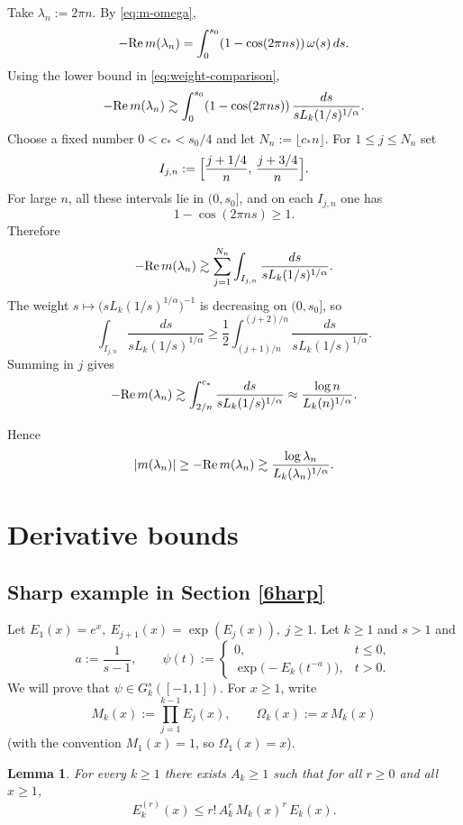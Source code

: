 \documentclass[11pt]{amsart}
\newtheorem{lemma}[theorem]{Lemma}
\renewcommand{\Re}{ {\rm Re}\,}
\newcommand{\1}{{\rm 1\hspace*{-0.4ex}%
			\rule{0.1ex}{1.52ex}\hspace*{0.2ex}}}
\numberwithin{equation}{section}
\begin{document}
Take $\lambda_n:=2\pi n.$
By \eqref{eq:m-omega},
\[
-\Re m(\lambda_n)=\int_0^{s_0}(1-\cos(2\pi ns))\,\omega(s)\,ds.
\]
Using the lower bound in \eqref{eq:weight-comparison},
\[
-\Re m(\lambda_n)
\gtrsim
\int_0^{s_0}(1-\cos(2\pi ns))\,\frac{ds}{sL_k(1/s)^{1/\alpha}}.
\]
Choose a fixed number $0<c_*<s_0/4$ and let $N_n:=\lfloor c_*n\rfloor$.
For $1\le j\le N_n$ set
\[
I_{j,n}:=\Bigl[\frac{j+1/4}{n},\,\frac{j+3/4}{n}\Bigr].
\]
For large $n$, all these intervals lie in $(0,s_0]$, and on each $I_{j,n}$ one has
\[
1-\cos(2\pi ns)\ge 1.
\]
Therefore
\[
-\Re m(\lambda_n)
\gtrsim
\sum_{j=1}^{N_n}\int_{I_{j,n}}\frac{ds}{sL_k(1/s)^{1/\alpha}}.
\]
The weight $s\mapsto \bigl(sL_k(1/s)^{1/\alpha}\bigr)^{-1}$ is decreasing on $(0,s_0]$, so
\[
\int_{I_{j,n}}\frac{ds}{sL_k(1/s)^{1/\alpha}}
\ge \frac12\int_{(j+1)/n}^{(j+2)/n}\frac{ds}{sL_k(1/s)^{1/\alpha}}.
\]
Summing in $j$ gives
\[
-\Re m(\lambda_n)
\gtrsim
\int_{2/n}^{c_*}\frac{ds}{sL_k(1/s)^{1/\alpha}}\approx
\frac{\log n}{L_k(n)^{1/\alpha}}.
\]

Hence
\begin{equation}
	\label{eq:lower-seq}
	|m(\lambda_n)|\ge -\Re m(\lambda_n)
	\gtrsim
	\frac{\log \lambda_n}{L_k(\lambda_n)^{1/\alpha}}.
\end{equation}
\section{Derivative bounds}\label{sec9}


\subsection{Sharp example in Section \ref{6harp}}\label{sec9.1}
Let $E_1(x)=e^x,\ E_{j+1}(x)=\exp(E_j(x)),\ j\ge1$. Let \(k\ge 1\) and \(s>1\) and
\[
a:=\frac1{s-1},
\qquad
\psi(t):=
\begin{cases}
	0,& t\le 0,\\[1mm]
	\exp\!\bigl(-E_k(t^{-a})\bigr),& t>0.
\end{cases}
\]
We will prove that \(\psi\in G_k^s([-1,1])\).
For \(x\ge 1\), write
\[
M_k(x):=\prod_{j=1}^{k-1}E_j(x),
\qquad
\Omega_k(x):=x\,M_k(x)
\]
(with the convention \(M_1(x)=1\), so \(\Omega_1(x)=x\)).

\begin{lemma}
	For every \(k\ge 1\) there exists \(A_k\ge 1\) such that for all \(r\ge 0\) and all
	\(x\ge 1\),
	\[
	E_k^{(r)}(x)\le r!\,A_k^r\,M_k(x)^r\,E_k(x).
	\]
\end{lemma}
\end{document}
